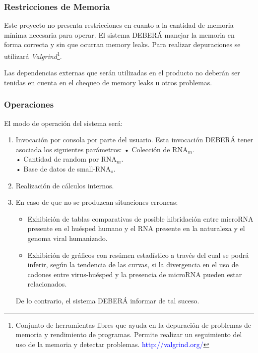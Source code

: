 \documentclass[12pt,a4paper,spanish]{article}
\begin{document}
	\subsubsection{Restricciones de Memoria}	
		\par Este proyecto no presenta restricciones en cuanto a la cantidad de memoria mínima necesaria para operar. El sistema DEBERÁ manejar la memoria 			en forma correcta y sin que ocurran memory leaks. Para realizar depuraciones se utilizará \textit{Valgrind}\footnote{Conjunto de herramientas 			libres que ayuda en la depuración de problemas de memoria y rendimiento de programas. Permite realizar un seguimiento del uso de la memoria y 			detectar problemas. \textcolor{blue}{http://valgrind.org/}}.
		\par Las dependencias externas que serán utilizadas en el producto no deberán ser tenidas en cuenta en el chequeo 
		de memory leaks u otros problemas.
		
	\subsubsection{Operaciones}
		El modo de operación del sistema será: 
		\begin{enumerate}
			\item Invocación por consola por parte del usuario. Esta invocación DEBERÁ tener asociada los siguientes parámetros: 
					\vskip 0.25cm
					\hspace*{0.75cm} • Colección de RNA$_m$. \\
					\hspace*{0.75cm} • Cantidad de random por RNA$_m$. \\
					\hspace*{0.75cm} • Base de datos de small-RNA$_s$. 
			\item Realización de cálculos internos.
			\item En caso de que no se produzcan situaciones erroneas: 
				\begin{itemize}
					\item Exhibición de tablas comparativas de posible hibridación entre microRNA presente en el huésped humano y el RNA presente en la 						  naturaleza y el genoma viral humanizado. 
					\item Exhibición de gráficos con resúmen estadístico a través del cual se podrá inferir, según la tendencia de las curvas, si la 							  divergencia en el uso de codones entre virus-huésped y la presencia de microRNA pueden estar relacionados.
				\end{itemize}
				De lo contrario, el sistema DEBERÁ informar de tal suceso.
		\end{enumerate}
\end{document}
